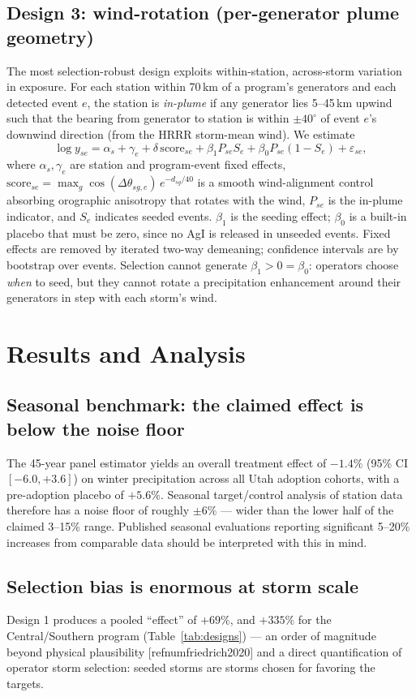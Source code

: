 \documentclass[9pt,twocolumn,twoside]{article}
\newcommand{\citeparen}[1]{[\csname refnum#1\endcsname]}
\begin{document}
\subsection{Design 3: wind-rotation (per-generator plume geometry)}
The most selection-robust design exploits within-station, across-storm
variation in exposure. For each station within 70\,km of a program's
generators and each detected event $e$, the station is \emph{in-plume} if any
generator lies 5--45\,km upwind such that the bearing from generator to
station is within $\pm 40^\circ$ of event $e$'s downwind direction (from the
HRRR storm-mean wind). We estimate
\[
\log y_{se} = \alpha_s + \gamma_e + \delta\,\mathrm{score}_{se} +
\beta_1 P_{se} S_e + \beta_0 P_{se}(1-S_e) + \varepsilon_{se},
\]
where $\alpha_s, \gamma_e$ are station and program-event fixed effects,
$\mathrm{score}_{se} = \max_g \cos(\Delta\theta_{sg,e})\,e^{-d_{sg}/40}$ is a
smooth wind-alignment control absorbing orographic anisotropy that rotates
with the wind, $P_{se}$ is the in-plume indicator, and $S_e$ indicates seeded
events. $\beta_1$ is the seeding effect; $\beta_0$ is a built-in placebo that
must be zero, since no AgI is released in unseeded events. Fixed effects are
removed by iterated two-way demeaning; confidence intervals are by bootstrap
over events. Selection cannot generate $\beta_1 > 0 = \beta_0$: operators
choose \emph{when} to seed, but they cannot rotate a precipitation
enhancement around their generators in step with each storm's wind.

\section{Results and Analysis}

\subsection{Seasonal benchmark: the claimed effect is below the noise floor}
The 45-year panel estimator yields an overall treatment effect of $-1.4\%$
(95\% CI $[-6.0, +3.6]$) on winter precipitation across all Utah adoption
cohorts, with a pre-adoption placebo of $+5.6\%$. Seasonal target/control
analysis of station data therefore has a noise floor of roughly $\pm 6\%$
--- wider than the lower half of the claimed 3--15\% range. Published
seasonal evaluations reporting significant 5--20\% increases from comparable
data should be interpreted with this in mind.

\subsection{Selection bias is enormous at storm scale}
Design 1 produces a pooled ``effect'' of $+69\%$, and $+335\%$ for the
Central/Southern program (Table~\ref{tab:designs}) --- an order of magnitude
beyond physical plausibility \citeparen{friedrich2020} and a direct
quantification of operator storm selection: seeded storms are storms chosen
for favoring the targets.
\end{document}
